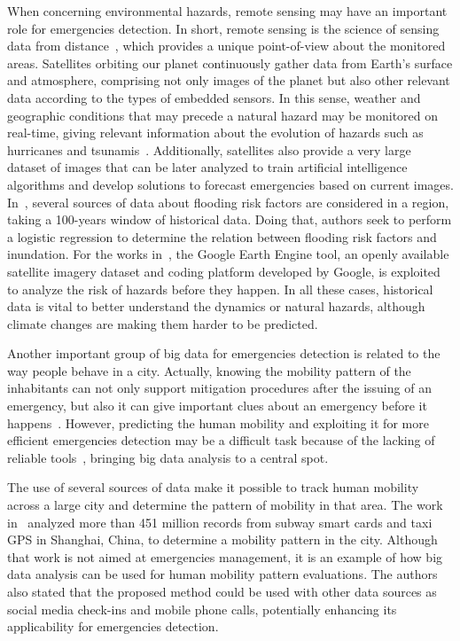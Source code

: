 \begin{refsection}
When concerning environmental hazards, remote sensing may have an important role for emergencies detection. In short, remote sensing is the science of sensing data from distance~\cite{bigdata1}, which provides a unique point-of-view about the monitored areas. Satellites orbiting our planet continuously gather data from Earth's surface and atmosphere, comprising not only images of the planet but also other relevant data according to the types of embedded sensors. In this sense, weather and geographic conditions that may precede a natural hazard may be monitored on real-time, giving relevant information about the evolution of hazards such as hurricanes and tsunamis~\cite{satellite2}. Additionally, satellites also provide a very large dataset of images that can be later analyzed to train artificial intelligence algorithms and develop solutions to forecast emergencies based on current images. In~\cite{bigdata2}, several sources of data about flooding risk factors are considered in a region, taking a 100-years window of historical data. Doing that, authors seek to perform a logistic regression to determine the relation between flooding risk factors and inundation. For the works in~\cite{satellite3,satellite4}, the Google Earth Engine tool, an openly available satellite imagery dataset and coding platform developed by Google, is exploited to analyze the risk of hazards before they happen. In all these cases, historical data is vital to better understand the dynamics or natural hazards, although climate changes are making them harder to be predicted. 

Another important group of big data for emergencies detection is related to the way people behave in a city. Actually, knowing the mobility pattern of the inhabitants can not only support mitigation procedures after the issuing of an emergency, but also it can give important clues about an emergency before it happens~\cite{bigdata1}. However, predicting the human mobility and exploiting it for more efficient emergencies detection may be a difficult task because of the lacking of reliable tools~\cite{humanMobility1}, bringing big data analysis to a central spot.

The use of several sources of data make it possible to track human mobility across a large city and determine the pattern of mobility in that area. The work in~\cite{bigdata3} analyzed more than 451 million records from subway smart cards and taxi GPS in Shanghai, China, to determine a mobility pattern in the city. Although that work is not aimed at emergencies management, it is an example of how big data analysis can be used for human mobility pattern evaluations. The authors also stated that the proposed method could be used with other data sources as social media check-ins and mobile phone calls, potentially enhancing its applicability for emergencies detection.


\end{refsection}
